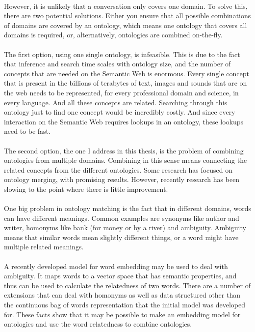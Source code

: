 \documentclass{article}
\begin{document}
 \paragraph{}
 However, it is unlikely that a conversation only covers one domain. To solve this, there are two potential solutions. Either you ensure that all possible combinations of domains are covered by an ontology, which means one ontology that covers all domains is required, or, alternatively, ontologies are combined on-the-fly.
 \paragraph{}
 The first option, using one single ontology, is infeasible. This is due to the fact that inference and search time scales with ontology size\cite{complexity},
 and the number of concepts that are needed on the Semantic Web is enormous. Every single concept that is present in the billions of terabytes of text, images and sounds that are on the web needs to be represented, for every professional domain and science, in every language. And all these concepts are related. Searching through this ontology just to find one concept would be incredibly costly. And since every interaction on the Semantic Web requires lookups in an ontology, these lookups need to be fast.
 \paragraph{}
 The second option, the one I address in this thesis, is the problem of combining ontologies from multiple domains. Combining in this sense means connecting the related concepts from the different ontologies. Some research has focused on ontology merging, with promising results. However, recently research has been slowing to the point where there is little improvement.
 \paragraph{}
 One big problem in ontology matching is the fact that in different domains, words can have different meanings. Common examples are synonyms like author and writer, homonyms like bank (for money or by a river) and ambiguity. Ambiguity means that similar words mean slightly different things, or a word might have multiple related meanings.
 \paragraph{}
 A recently developed model for word embedding may be used to deal with ambiguity. It maps words to a vector space that has semantic properties, and thus can be used to calculate the relatedness of two words. There are a number of extensions that can deal with homonyms as well as data structured other than the continuous bag of words representation that the initial model was developed for. These facts show that it may be possible to make an embedding model for ontologies and use the word relatedness to combine ontologies\cite{multisense}.
\end{document}

